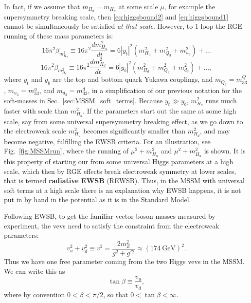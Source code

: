 \documentclass[notes.tex]{subfiles}
\begin{document}
In fact, if we assume that $m_{H_d} = m_{H_u}$ at some scale  $\mu$, for example the supersymmetry breaking scale, then \eqref{eq:higgsbound2} and \eqref{eq:higgsbound1} cannot be simultaneously be satisfied {\it at that scale}. However, to 1-loop the RGE running of these mass parameters is:
\[16\pi^2 \beta_{m_{H_u}^2} \equiv 16\pi^2 \frac{dm_{H_u}^2}{dt} = 6|y_t|^2(m_{H_u}^2 + m_{Q_3}^2 + m_{u_3}^2) + ...\]
\[16\pi^2 \beta_{m_{H_d}^2} \equiv 16\pi^2 \frac{dm_{H_d}^2}{dt} = 6|y_b|^2(m_{H_d}^2 + m_{Q_3}^2 + m_{d_3}^2) + ...,\]
where $y_t$ and $y_b$ are the top and bottom quark Yukawa couplings, and $m_{Q_3} = m_{33}^Q$, $m_{u_3}  = m_{33}^u$, and $m_{d_3} = m_{33}^d$, in a simplification of our previous notation for the soft-masses in Sec.~\ref{sec:MSSM_soft_terms}. Because $y_t\gg y_b$, $m_{H_u}^2$ runs much faster with scale than $m_{H_d}^2$. If the parameters start out the same at some high scale, say from some universal supersymmetry breaking effect,  as we go down to the electroweak scale  $m_{H_u}^2$ becomes significantly smaller than  $m_{H_d}^2$, and may become negative, fulfilling the EWSB criteria. For an illustration, see Fig.~\ref{fig:MSSMrun}, where the running of  $\mu^2+m_{H_u}^2$ and  $\mu^2+m_{H_u}^2$ is shown.
It is this property of starting our from some universal Higgs parameters at a high scale, which then by RGE effects break electroweak symmetry at lower scales, that is termed {\bf radiative EWSB} (REWSB). Thus, in the MSSM with universal soft terms at a high scale there is an explanation why EWSB happens, it is not put in by hand in the potential as it is in the Standard Model.


Following EWSB, to get the familiar vector boson masses measured by experiment, the vevs need to satisfy the constraint from the electroweak parameters:
\begin{equation}
v_u^2 + v_d^2 \equiv v^2 = \frac{2m_{Z}^2}{g^2 + g'{}^2} \approx (174~\text{GeV})^2.
\label{eq:Zmass_vev_condition}
\end{equation}
Thus we have one free parameter coming from the two Higgs vevs in the MSSM. We can write this as 
\[\tan\beta \equiv \frac{v_u}{v_d},\]
where by convention $0<\beta<\pi/2$, so that $0<\tan\beta<\infty$. 
\end{document}
